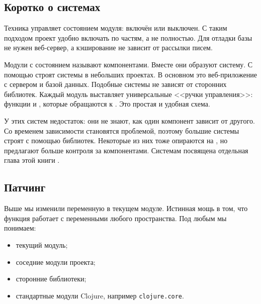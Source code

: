 \subsection{Коротко о системах}


\label{systems-intro}

Техника  управляет состоянием модуля: включён или
выключен. С таким подходом проект удобно включать по частям, а не полностью. Для
отладки базы не нужен веб-сервер, а кэширование не зависит от рассылки писем.

Модули с состоянием называют компонентами. Вместе они образуют систему. С
помощью  строят системы в небольших проектах. В основном
это веб-приложение с сервером и базой данных. Подобные системы не зависят от
сторонних библиотек. Каждый модуль выставляет универсальные <<ручки
управления>>: функции  и , которые обращаются к
. Это простая и удобная схема.

У этих систем недостаток: они не знают, как один компонент зависит от
другого. Со временем зависимости становятся проблемой, поэтому большие системы
строят с помощью библиотек. Некоторые из них тоже опираются на
, но предлагают больше контроля за компонентами. Системам
посвящена отдельная глава этой книги .

\subsection{Патчинг}


Выше мы изменили переменную в текущем модуле. Истинная мощь
 в том, что функция работает с переменными любого
пространства. Под любым мы понимаем:

\begin{itemize}

\item
  текущий модуль;

\item
  соседние модули проекта;

\item
  сторонние библиотеки;

\item
  стандартные модули Clojure, например \texttt{clo\-ju\-re.co\-re}.

\end{itemize}

